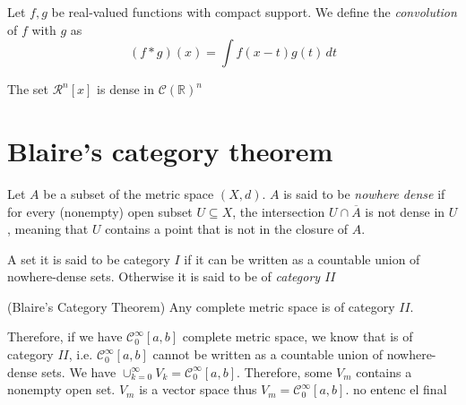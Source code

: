 \documentclass[../main.tex]{subfiles}
\begin{document}
\begin{definition}
	Let $f,g$ be real-valued functions with compact support. We define the \emph{convolution} of $f$ with $g$ as $$(f\ast g)(x)=\int f(x-t)g(t) \, dt$$
\end{definition}

\begin{corolari}
The set $\mathcal{R}^n[x]$ is dense in $\mathcal{C}(\mathbb{R})^n$
\end{corolari}
\section{Blaire's category theorem}

\begin{definition} Let $A$ be a subset of the metric space $(X,d)$. $A$ is said to be \emph{nowhere dense} if for every (nonempty) open subset $U\subseteq X$, the intersection $U\cap\overline{A}$ is not dense in $U$, meaning that $U$ contains a point that is not in the closure of $A$.
\end{definition}
\begin{definition}
	A set it is said to be category $I$ if it can be written as a countable union of nowhere-dense sets. Otherwise it is said to be of \emph{category $II$}
\end{definition}
\begin{theorem} (Blaire's Category Theorem)
	Any complete metric space is of category $II$.
\end{theorem}
\noindent Therefore, if we have $\mathcal{C}_0^\infty[a,b]$ complete metric space, we know that is of category $II$, i.e. $\mathcal{C}_0^\infty[a,b]$  cannot be written as a countable union of nowhere-dense sets. We have $\cup_{k=0}^\infty V_k = \mathcal{C}_0^\infty[a,b]$. Therefore, some $V_m$ contains a nonempty open set. $V_m$ is a vector space thus $V_m=\mathcal{C}_0^\infty[a,b]$. no entenc el final
\end{document}
